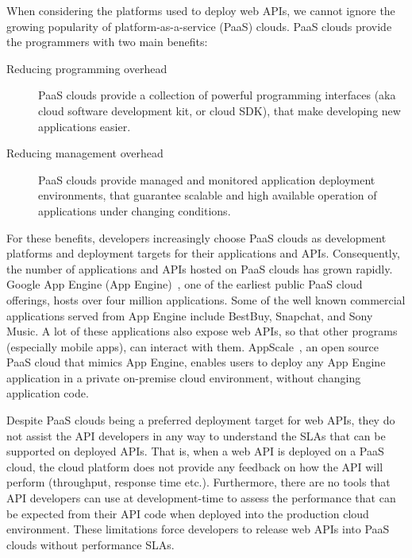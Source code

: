 When considering the platforms used to deploy web APIs, we cannot ignore the
growing popularity of platform-as-a-service (PaaS) clouds.
PaaS clouds provide the programmers with two main benefits:

\begin{description}
\item[Reducing programming overhead] PaaS clouds provide a collection of powerful programming 
interfaces (aka cloud software development kit, or cloud SDK), that make developing new applications 
easier.
\item[Reducing management overhead] PaaS clouds provide managed and monitored application deployment
environments, that guarantee scalable and high available operation of applications under changing conditions.
\end{description}

For these benefits, developers increasingly choose PaaS clouds as development platforms
and deployment targets for their applications and APIs. Consequently, the number of applications and 
APIs hosted on PaaS clouds has grown rapidly. Google App Engine (App Engine)~\cite{gae}, one of the earliest
public PaaS cloud offerings, hosts over four million applications. Some of the
well known commercial applications served from App Engine include BestBuy, Snapchat, 
and Sony Music. A lot of these applications also expose web APIs, so that other
programs (especially mobile apps), can interact with them. AppScale~\cite{6488671}, an open source PaaS cloud that
mimics App Engine, enables users to deploy any App Engine application in a private on-premise
cloud environment, without changing application code.

Despite PaaS clouds being a preferred deployment target for web APIs, they do not assist the API
developers in any way to understand the SLAs that can be supported on deployed APIs. That is,
when a web API is deployed on a PaaS cloud, the cloud platform does not provide any feedback 
on how the API will perform (throughput, response time etc.). Furthermore,
there are no tools that API developers can use at development-time to assess the performance
that can be expected from their API code when deployed into the production cloud environment.
These limitations force developers to release web APIs into PaaS clouds without performance SLAs.

